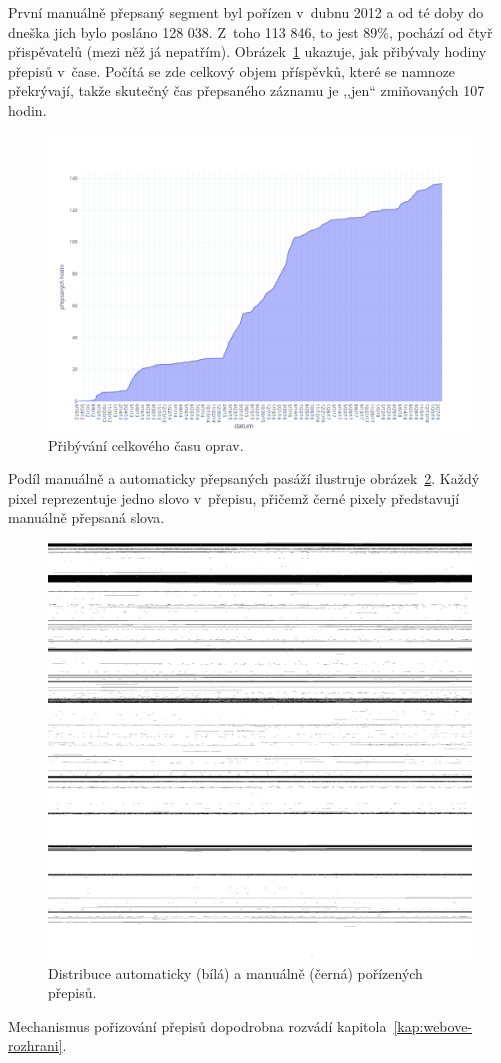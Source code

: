 První manuálně přepsaný segment byl pořízen v~dubnu 2012 a od té doby do dneška
jich bylo posláno 128 038. Z~toho 113 846, to jest 89\%, pochází od čtyř
přispěvatelů (mezi něž já nepatřím).
Obrázek~\ref{fig:corpus-growth} ukazuje, jak přibývaly hodiny přepisů v~čase.
Počítá se zde celkový objem příspěvků, které se namnoze překrývají, takže
skutečný čas přepsaného záznamu je ,,jen`` zmiňovaných 107 hodin.

\begin{figure}[htpb]
\includegraphics[scale=0.39]{rc/corpus-growth.png}
\caption{Přibývání celkového času oprav.}
\label{fig:corpus-growth}
\end{figure}

Podíl manuálně a automaticky přepsaných pasáží ilustruje
obrázek~\ref{fig:humbits}. Každý pixel reprezentuje jedno slovo v~přepisu,
přičemž černé pixely představují manuálně přepsaná slova.

\begin{figure}[htpb]
\includegraphics[scale=0.137]{rc/humbits.png}
\caption{Distribuce automaticky (bílá) a manuálně (černá) pořízených přepisů.}
\label{fig:humbits}
\end{figure}

Mechanismus pořizování přepisů dopodrobna rozvádí kapitola~\ref{kap:webove-rozhrani}. 
